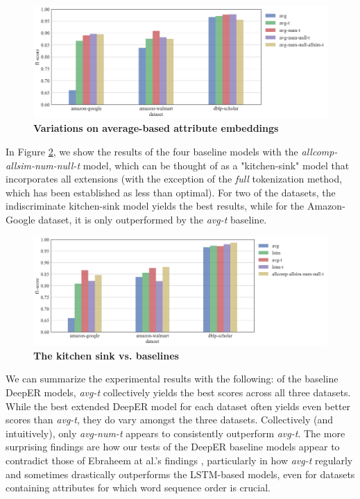 \documentclass{proc}
\begin{document}
\begin{figure}
	\includegraphics[scale=0.22]{../imgs/results-avg.png}
	\caption{\textbf{Variations on average-based attribute embeddings}}
	\label{fig:results-avg}
\end{figure}

In Figure \ref{fig:results-kitchen-sink}, we show the results of the four baseline models with the \textit{allcomp-allsim-num-null-t} model, which can be thought of as a "kitchen-sink" model that incorporates all extensions (with the exception of the \textit{full} tokenization method, which has been established as less than optimal). For two of the datasets, the indiscriminate  kitchen-sink model yields the best results, while for the Amazon-Google dataset, it is only outperformed by the \textit{avg-t} baseline.

\begin{figure}
	\includegraphics[scale=0.20]{../imgs/results-kitchen-sink.png}
	\caption{\textbf{The kitchen sink vs. baselines}}
	\label{fig:results-kitchen-sink}
\end{figure}

We can summarize the experimental results with the following: of the baseline DeepER models, \textit{avg-t} collectively yields the best scores across all three datasets. While the best extended DeepER model for each dataset often yields even better scores than \textit{avg-t}, they do vary amongst the three datasets. Collectively (and intuitively), only \textit{avg-num-t} appears to consistently outperform \textit{avg-t}. The more surprising findings are how our tests of the DeepER baseline models appear to contradict those of Ebraheem at al.'s findings \cite{ebraheem-deep-er}, particularly in how \textit{avg-t} regularly and sometimes drastically outperforms the LSTM-based models, even for datasets containing attributes for which word sequence order is crucial.
\end{document}

